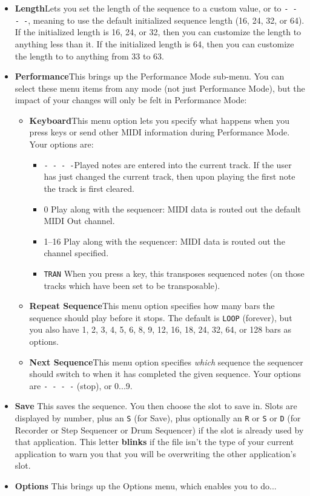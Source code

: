 \documentclass{article}
\begin{document}
\begin{itemize}
\item {\bf Length}\quad  Lets you set the length of the sequence to a custom value, or to \texttt{- - - -}, meaning to use the default initialized sequence length (16, 24, 32, or 64).  If the initialized length is 16, 24, or 32, then you can customize the length to anything less than it.  If the initialized length is 64, then you can customize the length to to anything from 33 to 63.

\item {\bf Performance}\quad  This brings up the Performance Mode sub-menu.  You can select these menu items from any mode (not just Performance Mode), but the impact of your changes will only be felt in Performance Mode:

\begin{itemize}
\item {\bf Keyboard}\quad  This menu option lets you specify what happens when you press keys or send other MIDI information during Performance Mode.  Your options are:

 \renewcommand\labelitemiii{$\diamond$}
\begin{itemize}
	\item {\texttt{-~-~-~-}}\quad Played notes are entered into the current track.  If the user has just changed the current track, then upon playing the first note the track is first cleared.
	\item {0} \quad Play along with the sequencer: MIDI data is routed out the default MIDI Out channel.
	\item {1--16} \quad Play along with the sequencer: MIDI data is routed out the channel specified.
	\item {\texttt{TRAN}} \quad When you press a key, this transposes sequenced notes (on those tracks which have been set to be transposable).
\end{itemize}

\item {\bf Repeat Sequence}\quad This menu option specifies how many bars the sequence should play before it stops.  The default is {\tt LOOP} (forever), but you also have 1, 2, 3, 4, 5, 6, 8, 9, 12, 16, 18, 24, 32, 64, or 128 bars as options.
\item {\bf Next Sequence}\quad This menu option specifies {\it which} sequence the sequencer should switch to when it has completed the given sequence.  Your options are {\tt - - - -} (stop), or 0...9.
\end{itemize} 

\item {\bf Save} \quad This saves the sequence. You then choose the slot to save in.  Slots are displayed by number, plus an \texttt{S} (for Save), plus optionally an \texttt{R} or \texttt{S} or \texttt{D} (for Recorder or Step Sequencer or Drum Sequencer) if the slot is already used by that application.  This letter {\bf blinks} if the file isn't the type of your current application to warn you that you will be overwriting the other application's slot.

\item {\bf Options} \quad This brings up the Options menu, which enables you to do...
\end{itemize}
\end{document}
